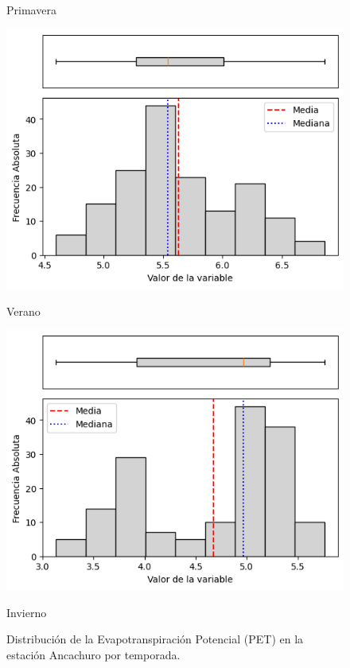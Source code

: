 \begin{figure}[H]
\begin{minipage}{0.48\textwidth}
    \caption*{Primavera}
\end{minipage}
\vspace{0.3cm}
\begin{minipage}{0.48\textwidth}
    \centering
    \includegraphics[width=\linewidth]{resultados/por_estacion_del_anio/Ancachuro/PET_HistBoxplot_Summer.png}
    \caption*{Verano}
\end{minipage}
\hfill
\begin{minipage}{0.48\textwidth}
    \centering
    \includegraphics[width=\linewidth]{resultados/por_estacion_del_anio/Ancachuro/PET_HistBoxplot_Winter.png}
    \caption*{Invierno}
\end{minipage}
\caption{Distribución de la Evapotranspiración Potencial (PET) en la estación Ancachuro por temporada.}
\label{fig:pet_hist_ancachuro}
\end{figure}

